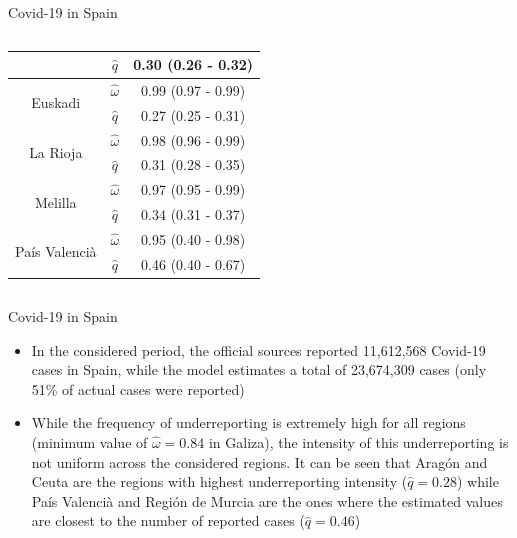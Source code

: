 \documentclass[aspectratio=169,usepdftitle=true]{beamer}
\begin{document}
\begin{frame}{Covid-19 in Spain}
\begin{columns}
\begin{column}{0.6\textwidth}
\begin{table}
{\begin{tabular}{ccc}
                             & $\hat{q}$       & 0.30 (0.26 - 0.32)\\
\midrule
\multirow{2}{*}{Euskadi}    & $\hat{\omega}$  & 0.99 (0.97 - 0.99) \\
                            & $\hat{q}$       & 0.27 (0.25 - 0.31) \\
\midrule
\multirow{2}{*}{La Rioja}    & $\hat{\omega}$  & 0.98 (0.96 - 0.99) \\
                             & $\hat{q}$       & 0.31 (0.28 - 0.35) \\
\midrule
\multirow{2}{*}{Melilla}    & $\hat{\omega}$  & 0.97 (0.95 - 0.99) \\
                            & $\hat{q}$       & 0.34 (0.31 - 0.37) \\
\midrule
\multirow{2}{*}{Pa\'is Valenci\`a}    & $\hat{\omega}$  & 0.95 (0.40 - 0.98) \\
                                      & $\hat{q}$       & 0.46 (0.40 - 0.67) \\
\bottomrule
\end{tabular}}
\end{table}
\end{column}
\end{columns}
\end{frame}

\begin{frame}{Covid-19 in Spain}
\begin{itemize}
\item In the considered period, the official sources reported 11,612,568 Covid-19 cases in Spain, while the model estimates a total of 23,674,309 cases (only 51\% of actual cases were reported) \item While the frequency of underreporting is extremely high for all regions (minimum value of $\hat{\omega}=0.84$ in Galiza), the intensity of this underreporting is not uniform across the considered regions. It can be seen that Arag\'on and Ceuta are the regions with highest underreporting intensity ($\hat{q}=0.28$) while Pa\'is Valenci\`a and Regi\'on de Murcia are the ones where the estimated values are closest to the number of reported cases ($\hat{q}=0.46$)
\end{itemize}
\end{frame}
\end{document}
